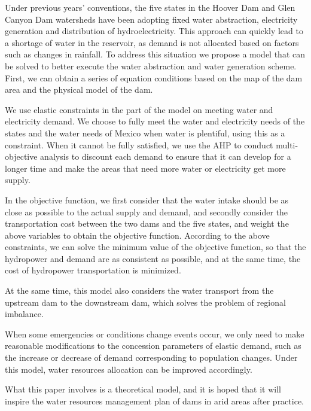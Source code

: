 \documentclass{mcmthesis}
\begin{document}
Under previous years' conventions, the five states in the Hoover Dam and Glen Canyon Dam watersheds have been adopting fixed water abstraction, electricity generation and distribution of hydroelectricity. This approach can quickly lead to a shortage of water in the reservoir, as demand is not allocated based on factors such as changes in rainfall.
To address this situation we propose a model that can be solved to better execute the water abstraction and water generation scheme. First, we can obtain a series of equation conditions based on the map of the dam area and the physical model of the dam.

\begin{figure}[h]
	\centering
\end{figure}
We use elastic constraints in the part of the model on meeting water and electricity demand. We choose to fully meet the water and electricity needs of the states and the water needs of Mexico when water is plentiful, using this as a constraint. When it cannot be fully satisfied, we use the AHP to conduct multi-objective analysis to discount each demand to ensure that it can develop for a longer time and make the areas that need more water or electricity get more supply.

In the objective function, we first consider that the water intake should be as close as possible to the actual supply and demand, and secondly consider the transportation cost between the two dams and the five states, and weight the above variables to obtain the objective function. According to the above constraints, we can solve the minimum value of the objective function, so that the hydropower and demand are as consistent as possible, and at the same time, the cost of hydropower transportation is minimized.

At the same time, this model also considers the water transport from the upstream dam to the downstream dam, which solves the problem of regional imbalance.

When some emergencies or conditions change events occur, we only need to make reasonable modifications to the concession parameters of elastic demand, such as the increase or decrease of demand corresponding to population changes. Under this model, water resources allocation can be improved accordingly.

What this paper involves is a theoretical model, and it is hoped that it will inspire the water resources management plan of dams in arid areas after practice. 
\end{document}
